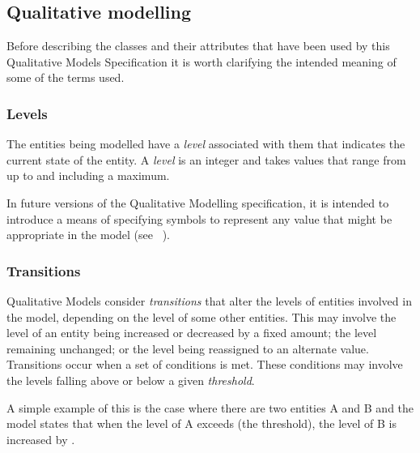 \pagebreak
\subsection{Qualitative modelling}
\label{qual}

Before describing the classes and their attributes that have been used by this Qualitative Models Specification it is worth clarifying the intended meaning of some of the terms used. 

\subsubsection{Levels}


The entities being modelled have a \emph{level} associated with them that indicates the current state of the entity. A \emph{level} is an integer and takes values that range from  up to and including a maximum.

In future versions of the Qualitative Modelling specification, it is intended to introduce a means of specifying symbols to represent any value that might be appropriate in the model (see ~).

\smallskip

\subsubsection{Transitions}

Qualitative Models consider \emph{transitions} that alter the levels of entities involved in the model, depending on the level of some other entities.  This may involve the level of an entity being increased or decreased by a fixed amount; the level remaining unchanged; or the level being reassigned to an alternate value. Transitions occur when a set of conditions is met. These conditions may involve the levels falling above or below  a given \emph{threshold}. 

A simple example of this is the case where there are two entities A and B and the model states that when the level of A exceeds  (the threshold), the level of B is increased by . 

